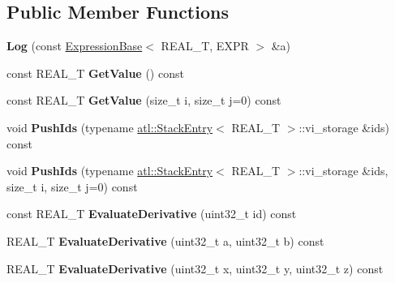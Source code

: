 \subsection*{Public Member Functions}
\begin{DoxyCompactItemize}
\item 
\hypertarget{structatl_1_1_log_a01abc5bb1b4709e5fe34aa8bd568b23e}{{\bfseries Log} (const \hyperlink{structatl_1_1_expression_base}{Expression\+Base}$<$ R\+E\+A\+L\+\_\+\+T, E\+X\+P\+R $>$ \&a)}\label{structatl_1_1_log_a01abc5bb1b4709e5fe34aa8bd568b23e}

\item 
\hypertarget{structatl_1_1_log_a8af40586a9e836d67ce0ddf122992b95}{const R\+E\+A\+L\+\_\+\+T {\bfseries Get\+Value} () const }\label{structatl_1_1_log_a8af40586a9e836d67ce0ddf122992b95}

\item 
\hypertarget{structatl_1_1_log_ac6862ef00614119ee8292e4ef4d5727c}{const R\+E\+A\+L\+\_\+\+T {\bfseries Get\+Value} (size\+\_\+t i, size\+\_\+t j=0) const }\label{structatl_1_1_log_ac6862ef00614119ee8292e4ef4d5727c}

\item 
\hypertarget{structatl_1_1_log_a9b2175cc67290f3ca534d51ff1a21c39}{void {\bfseries Push\+Ids} (typename \hyperlink{structatl_1_1_stack_entry}{atl\+::\+Stack\+Entry}$<$ R\+E\+A\+L\+\_\+\+T $>$\+::vi\+\_\+storage \&ids) const }\label{structatl_1_1_log_a9b2175cc67290f3ca534d51ff1a21c39}

\item 
\hypertarget{structatl_1_1_log_ae123e08e7c97c734d3e736304f0c88ac}{void {\bfseries Push\+Ids} (typename \hyperlink{structatl_1_1_stack_entry}{atl\+::\+Stack\+Entry}$<$ R\+E\+A\+L\+\_\+\+T $>$\+::vi\+\_\+storage \&ids, size\+\_\+t i, size\+\_\+t j=0) const }\label{structatl_1_1_log_ae123e08e7c97c734d3e736304f0c88ac}

\item 
\hypertarget{structatl_1_1_log_ad0b35fedc0e0b135e1d0c18f81f69129}{const R\+E\+A\+L\+\_\+\+T {\bfseries Evaluate\+Derivative} (uint32\+\_\+t id) const }\label{structatl_1_1_log_ad0b35fedc0e0b135e1d0c18f81f69129}

\item 
\hypertarget{structatl_1_1_log_aaf20b252f35c9319c701ceeeef906c2c}{R\+E\+A\+L\+\_\+\+T {\bfseries Evaluate\+Derivative} (uint32\+\_\+t a, uint32\+\_\+t b) const }\label{structatl_1_1_log_aaf20b252f35c9319c701ceeeef906c2c}

\item 
\hypertarget{structatl_1_1_log_a2795bc68d354d69bdca6f2f2676bac21}{R\+E\+A\+L\+\_\+\+T {\bfseries Evaluate\+Derivative} (uint32\+\_\+t x, uint32\+\_\+t y, uint32\+\_\+t z) const }\label{structatl_1_1_log_a2795bc68d354d69bdca6f2f2676bac21}


\end{DoxyCompactItemize}
